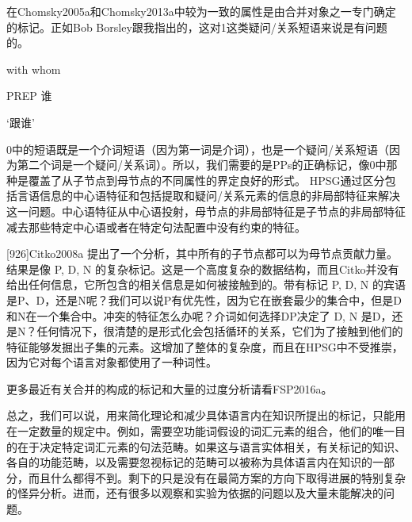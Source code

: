 在Chomsky2005a和Chomsky2013a中较为一致的属性是由合并对象之一专门确定的标记。正如Bob Borsley跟我指出的，这对1这类疑问/关系短语来说是有问题的。




with whom

PREP 谁

`跟谁'

0中的短语既是一个介词短语（因为第一词是介词），也是一个疑问/关系短语（因为第二个词是一个疑问/关系词）。所以，我们需要的是PPs的正确标记，像0中那种是覆盖了从子节点到母节点的不同属性的界定良好的形式。 
HPSG通过区分包括言语信息的中心语特征和包括提取和疑问/关系元素的信息的非局部特征来解决这一问题。中心语特征从中心语投射，母节点的非局部特征是子节点的非局部特征减去那些特定中心语或者在特定句法配置中没有约束的特征。

[926]Citko2008a 提出了一个分析，其中所有的子节点都可以为母节点贡献力量。结果是像 P,  D, N  的复杂标记。这是一个高度复杂的数据结构，而且Citko并没有给出任何信息，它所包含的相关信息是如何被接触到的。带有标记 P,  D, N  的宾语是P、D，还是N呢？我们可以说P有优先性，因为它在嵌套最少的集合中，但是D和N在一个集合中。冲突的特征怎么办呢？介词如何选择DP决定了 D, N 是D，还是N？任何情况下，很清楚的是形式化会包括循环的关系，它们为了接触到他们的特征能够发掘出子集的元素。这增加了整体的复杂度，而且在HPSG中不受推崇，因为它对每个语言对象都使用了一种词性。























更多最近有关合并的构成的标记和大量的过度分析请看FSP2016a。



总之，我们可以说，用来简化理论和减少具体语言内在知识所提出的标记，只能用在一定数量的规定中。例如，需要空功能词假设的词汇元素的组合，他们的唯一目的在于决定特定词汇元素的句法范畴。如果这与语言实体相关，有关标记的知识、各自的功能范畴，以及需要忽视标记的范畴可以被称为具体语言内在知识的一部分，而且什么都得不到。剩下的只是没有在最简方案的方向下取得进展的特别复杂的怪异分析。进而，还有很多以观察和实验为依据的问题以及大量未能解决的问题。











